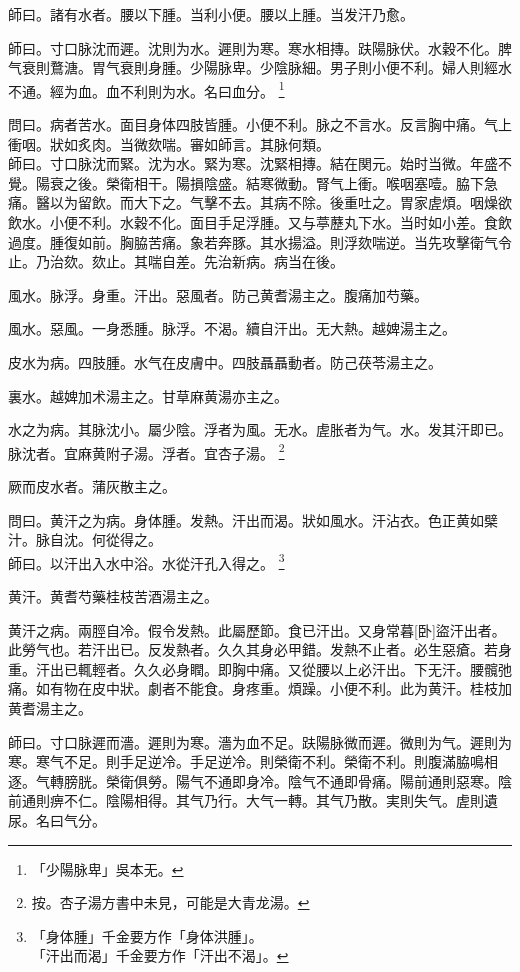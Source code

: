 \documentclass[12pt,twoside,UTF8,b5paper]{ctexbook}
\begin{document}
師曰。諸有水者。腰以下腫。当利小便。腰以上腫。当发汗乃愈。

師曰。寸口脉沈而遲。沈則为水。遲則为寒。寒水相摶。趺陽脉伏。水穀不化。脾气衰則鶩溏。胃气衰則身腫。少陽脉卑。少陰脉細。男子則小便不利。婦人則經水不通。經为血。血不利則为水。名曰血分。
	\footnote{「少陽脉卑」吳本无。}

問曰。病者苦水。面目身体四肢皆腫。小便不利。脉之不言水。反言胸中痛。气上衝咽。狀如炙肉。当微欬喘。審如師言。其脉何類。\\
師曰。寸口脉沈而緊。沈为水。緊为寒。沈緊相摶。結在関元。始时当微。年盛不覺。陽衰之後。榮衛相干。陽損陰盛。結寒微動。腎气上衝。喉咽塞噎。脇下急痛。醫以为留飲。而大下之。气擊不去。其病不除。後重吐之。胃家虗煩。咽燥欲飲水。小便不利。水穀不化。面目手足浮腫。又与葶藶丸下水。当时如小差。食飲過度。腫復如前。胸脇苦痛。象若奔豚。其水揚溢。則浮欬喘逆。当先攻擊衛气令止。乃治欬。欬止。其喘自差。先治新病。病当在後。

風水。脉浮。身重。汗出。惡風者。防己黄耆湯主之。腹痛加芍藥。

風水。惡風。一身悉腫。脉浮。不渴。續自汗出。无大熱。越婢湯主之。

皮水为病。四肢腫。水气在皮膚中。四肢聶聶動者。防己茯苓湯主之。

裏水。越婢加术湯主之。甘草麻黄湯亦主之。

水之为病。其脉沈小。屬少陰。浮者为風。无水。虗胀者为气。水。发其汗即已。脉沈者。宜麻黄附子湯。浮者。宜杏子湯。
	\footnote{按。杏子湯方書中未見，可能是大青龙湯。}

厥而皮水者。蒲灰散主之。

問曰。黄汗之为病。身体腫。发熱。汗出而渴。狀如風水。汗沾衣。色正黄如檗汁。脉自沈。何從得之。\\
師曰。以汗出入水中浴。水從汗孔入得之。
	\footnote{「身体腫」千金要方作「身体洪腫」。\\「汗出而渴」千金要方作「汗出不渴」。}

黄汗。黄耆芍藥桂枝苦酒湯主之。

黄汗之病。兩脛自冷。假令发熱。此屬歷節。食已汗出。又身常暮[卧]盜汗出者。此勞气也。若汗出已。反发熱者。久久其身必甲錯。发熱不止者。必生惡瘡。若身重。汗出已輒輕者。久久必身瞤。即胸中痛。又從腰以上必汗出。下无汗。腰髖弛痛。如有物在皮中狀。劇者不能食。身疼重。煩躁。小便不利。此为黄汗。桂枝加黄耆湯主之。

師曰。寸口脉遲而濇。遲則为寒。濇为血不足。趺陽脉微而遲。微則为气。遲則为寒。寒气不足。則手足逆冷。手足逆冷。則榮衛不利。榮衛不利。則腹滿脇鳴相逐。气轉膀胱。榮衛俱勞。陽气不通即身冷。陰气不通即骨痛。陽前通則惡寒。陰前通則痹不仁。陰陽相得。其气乃行。大气一轉。其气乃散。実則失气。虗則遺尿。名曰气分。
\end{document}

